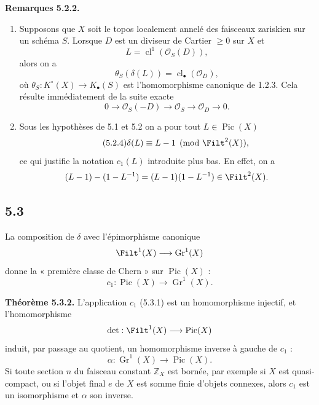 \documentclass[11pt]{article}
\newcommand{\Gr}{\operatorname{Gr}}
\newcommand{\cl}{\operatorname{cl}}
\providecommand{\Pic}{\operatorname{Pic}}
\providecommand{\Gr}{\operatorname{Gr}}
\providecommand{\Gr}{\operatorname{G}}
\begin{document}
\textbf{Remarques 5.2.2.}
\begin{enumerate}[label=\alph*)]
\item Supposons que \(X\) soit le topos localement annelé des faisceaux zariskien sur un schéma \(S\). Lorsque \(D\) est un diviseur de Cartier \(\geq0\) sur \(X\) et
\[
 L=\cl^1(\mathcal O_S(D)),
\]
alors on a
\begin{equation}\tag{5.2.3}
 \theta_S(\delta(L))=\cl_\bullet(\mathcal O_D),
\end{equation}
où \(\theta_S:K^\circ(X)\to K_\bullet(S)\) est l'homomorphisme canonique de 1.2.3. Cela résulte immédiatement de la suite exacte
\[
0\longrightarrow\mathcal O_S(-D)\longrightarrow\mathcal O_S\longrightarrow\mathcal O_D\longrightarrow0.
\]

\item Sous les hypothèses de 5.1 et 5.2 on a pour tout \(L\in\Pic(X)\)
\begin{equation}\tag{5.2.4}
 \delta(L)\equiv L-1\pmod{\Filt^2(X)},
\end{equation}
ce qui justifie la notation \(c_1(L)\) introduite plus bas. En effet, on a
\[
 (L-1)-(1-L^{-1})=(L-1)(1-L^{-1})\in\Filt^2(X).
\]
\end{enumerate}

\subsection*{5.3}
La composition de \(\delta\) avec l'épimorphisme canonique
\[
 \Filt^1(X)\longrightarrow\Gr^1(X)
\]
donne la « première classe de Chern » sur \(\Pic(X)\) :
\begin{equation}\tag{5.3.1}
 c_1:\Pic(X)\longrightarrow\Gr^1(X).
\end{equation}

\textbf{Théorème 5.3.2.} L'application \(c_1\) (5.3.1) est un homomorphisme injectif, et l'homomorphisme
\[
 \det:\Filt^1(X)\longrightarrow\Pic(X)
\]
induit, par passage au quotient, un homomorphisme inverse à gauche de \(c_1\) :
\[
 \alpha:\Gr^1(X)\longrightarrow\Pic(X).
\]
Si toute section \(n\) du faisceau constant \(\mathbb Z_X\) est bornée, par exemple si \(X\) est quasi-compact, ou si l'objet final \(e\) de \(X\) est somme finie d'objets connexes, alors \(c_1\) est un isomorphisme et \(\alpha\) son inverse.
\end{document}

